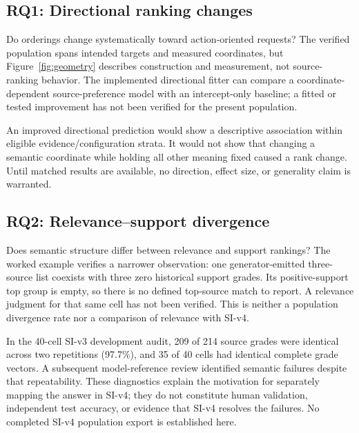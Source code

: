 \subsection{RQ1: Directional ranking changes}
\label{sec:directional}
Do orderings change systematically toward action-oriented requests? The verified population spans intended targets and measured coordinates, but Figure~\ref{fig:geometry} describes construction and measurement, not source-ranking behavior. The implemented directional fitter can compare a coordinate-dependent source-preference model with an intercept-only baseline; a fitted or tested improvement has not been verified for the present population.

 An improved directional prediction would show a descriptive association within eligible evidence/configuration strata. It would not show that changing a semantic coordinate while holding all other meaning fixed caused a rank change. Until matched results are available, no direction, effect size, or generality claim is warranted.

\subsection{RQ2: Relevance--support divergence}
\label{sec:divergence}
Does semantic structure differ between relevance and support rankings? The worked example verifies a narrower observation: one generator-emitted three-source list coexists with three zero historical support grades. Its positive-support top group is empty, so there is no defined top-source match to report. A relevance judgment for that same cell has not been verified. This is neither a population divergence rate nor a comparison of relevance with SI-v4.

In the 40-cell SI-v3 development audit, 209 of 214 source grades were identical across two repetitions (97.7\%), and 35 of 40 cells had identical complete grade vectors. A subsequent model-reference review identified semantic failures despite that repeatability. These diagnostics explain the motivation for separately mapping the answer in SI-v4; they do not constitute human validation, independent test accuracy, or evidence that SI-v4 resolves the failures. No completed SI-v4 population export is established here.

